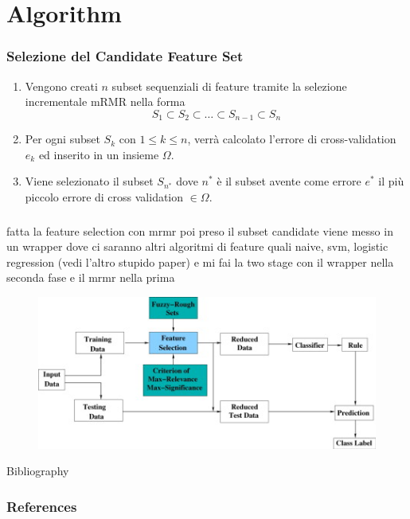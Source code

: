 \documentclass{beamer}
\begin{document}
\section{Algorithm}
\begin{frame}
	\frametitle{Selezione del Candidate Feature Set}
	\begin{enumerate}
		\item Vengono creati $n$ subset sequenziali di feature tramite la selezione incrementale mRMR nella forma
		$$S_1 \subset S_2 \subset \dots \subset S_{n-1} \subset S_n $$
		\item Per ogni subset $S_k$ con $1 \leq k \leq n$, verrà calcolato l'errore di cross-validation $e_k$ ed inserito in un insieme $\Omega$.
		\item Viene selezionato il subset $S_{n^*}$ dove $n^*$ è il subset avente come errore $e^*$ il più piccolo errore di cross validation $\in \Omega$.
	\end{enumerate}
\end{frame}

\begin{frame}
	\frametitle{}
	fatta la feature selection con mrmr poi preso il subset candidate viene messo in un wrapper dove ci saranno altri algoritmi di feature quali naive, svm, logistic regression (vedi l'altro stupido paper) e mi fai la two stage con il wrapper nella seconda fase e il mrmr nella prima
\begin{figure}[htb]
	\includegraphics[width=1\textwidth]{figure/schema.jpg}
\end{figure}
\end{frame}

\begin{frame}{Bibliography}
	\frametitle{References}
	
	
\end{frame}
\end{document}
